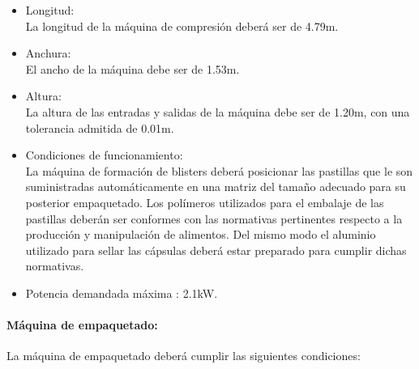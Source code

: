 		\begin{itemize}
			\item{Longitud:}\\
			La longitud de la máquina de compresión deberá ser de 4.79m.  

			\item{Anchura:}\\
			El ancho de la máquina debe ser de 1.53m.
			
			\item{Altura:}\\
			La altura de las entradas y salidas de la máquina debe ser de 1.20m, con una tolerancia admitida de 0.01m.
			
			
			\item{Condiciones de funcionamiento: }\\
			La máquina de formación de blisters deberá posicionar las pastillas que le son suministradas automáticamente en una matriz del tamaño adecuado para su posterior empaquetado. Los polímeros utilizados para el embalaje de las pastillas deberán ser conformes con las normativas pertinentes respecto a la producción y manipulación de alimentos. Del mismo modo el aluminio utilizado para sellar las cápsulas deberá estar preparado para cumplir dichas normativas. 

			

			\item{Potencia demandada máxima :} 2.1kW.
		
		\end{itemize}		


\paragraph{Máquina de empaquetado:}
		La máquina de empaquetado deberá cumplir las siguientes condiciones:
		
